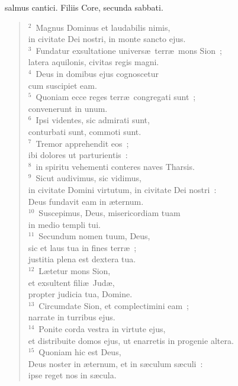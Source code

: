 \bchapter
{}salmus cantici. Filiis Core, secunda sabbati.
\begin{flushleft}\begin{verse}\vspace{6pt}${}^{2}$~Magnus Dominus et laudabilis nimis,\\ in civitate Dei nostri, in monte sancto ejus.\\
${}^{3}$~Fundatur exsultatione univers\ae\ terr\ae\ mons Sion~;\\ latera aquilonis, civitas regis magni.\\
${}^{4}$~Deus in domibus ejus cognoscetur\\ cum suscipiet eam.\\
${}^{5}$~Quoniam ecce reges terr\ae\ congregati sunt~;\\ convenerunt in unum.\\
${}^{6}$~Ipsi videntes, sic admirati sunt,\\ conturbati sunt, commoti sunt.\\
${}^{7}$~Tremor apprehendit eos~;\\ ibi dolores ut parturientis~:\\
${}^{8}$~in spiritu vehementi conteres naves Tharsis.\\
${}^{9}$~Sicut audivimus, sic vidimus,\\ in civitate Domini virtutum, in civitate Dei nostri~:\\ Deus fundavit eam in \ae ternum.\\
${}^{10}$~Suscepimus, Deus, misericordiam tuam\\ in medio templi tui.\\
${}^{11}$~Secundum nomen tuum, Deus,\\ sic et laus tua in fines terr\ae~;\\ justitia plena est dextera tua.\\
${}^{12}$~L\ae tetur mons Sion,\\ et exsultent fili\ae\ Jud\ae ,\\ propter judicia tua, Domine.\\
${}^{13}$~Circumdate Sion, et complectimini eam~;\\ narrate in turribus ejus.\\
${}^{14}$~Ponite corda vestra in virtute ejus,\\ et distribuite domos ejus, ut enarretis in progenie altera.\\
${}^{15}$~Quoniam hic est Deus,\\ Deus noster in \ae ternum, et in s\ae culum s\ae culi~:\\ ipse reget nos in s\ae cula.\end{verse}\end{flushleft}



